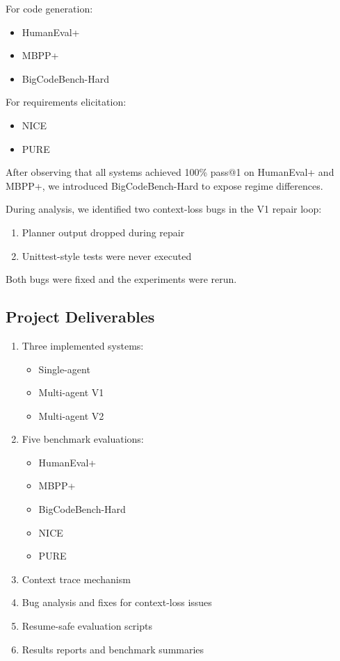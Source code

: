 \documentclass[11pt]{article}
\begin{document}
For code generation:
\begin{itemize}
    \item HumanEval+
    \item MBPP+
    \item BigCodeBench-Hard
\end{itemize}

For requirements elicitation:
\begin{itemize}
    \item NICE
    \item PURE
\end{itemize}

After observing that all systems achieved 100\% pass@1 on HumanEval+ and MBPP+, we introduced BigCodeBench-Hard to expose regime differences.

During analysis, we identified two context-loss bugs in the V1 repair loop:
\begin{enumerate}
    \item Planner output dropped during repair
    \item Unittest-style tests were never executed
\end{enumerate}

Both bugs were fixed and the experiments were rerun.

\subsection{Project Deliverables}

\begin{enumerate}
    \item Three implemented systems:
    \begin{itemize}
        \item Single-agent
        \item Multi-agent V1
        \item Multi-agent V2
    \end{itemize}
    
    \item Five benchmark evaluations:
    \begin{itemize}
        \item HumanEval+
        \item MBPP+
        \item BigCodeBench-Hard
        \item NICE
        \item PURE
    \end{itemize}
    
    \item Context trace mechanism
    
    \item Bug analysis and fixes for context-loss issues
    
    \item Resume-safe evaluation scripts
    
    \item Results reports and benchmark summaries
\end{enumerate}
\end{document}
